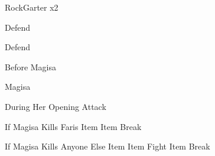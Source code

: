 \begin{paracol}{2}
\switchcolumn
\begin{encounter}{RockGarter x2}
	\varwb
	\begin{notes}
		\item {}
	\end{notes}
	\begin{round}{1}
		\faris Defend
        \begin{notes}
            \item[] 
        \end{notes}
        \lenna \leftCommand{\black} \then \fire \space \then {}
        \begin{notes}
            \item[] 
        \end{notes}
        \galuf Defend
        \begin{notes}
            \item[] 
        \end{notes}
        \bartz \leftCommand{\black} \then \fire \space \then {}
        \begin{notes}
            \item[] 
        \end{notes}
	\end{round}
	\varwe
\end{encounter}

\switchcolumn
\begin{steproute}{Before Magisa}
\end{steproute}

\switchcolumn
\begin{boss}{Magisa}
    \varwb
    \begin{bossPart}{During Her Opening Attack}
        \item {}
        \vspace{1mm}
        \item [] 
    \end{bossPart}
    \begin{bossPart}{If Magisa Kills Faris}
        \bartz Item \then \phoenixDown \space \then {}
        \galuf Item \then {} \then Break
    \end{bossPart}
    \begin{bossPart}{If Magisa Kills Anyone Else}
        \faris Item \then \phoenixDown \then {}
        \anyone Item \then {} \then Fight \then {}
        \anyone Item \then {} \then Break
    \end{bossPart}
    \varwe
\end{boss}

\end{paracol}